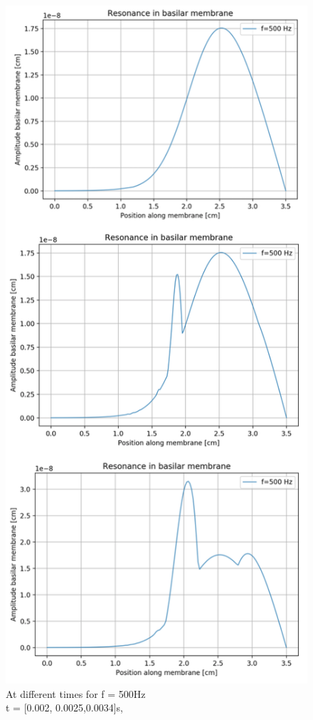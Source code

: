 \documentclass[twoside,twocolumn]{article}
\begin{document}
\begin{figure}[ht]
\centerline{\includegraphics[scale= 0.65]{Pictures/together.png}}
\caption{At different times for f = 500Hz \\ t = [0.002, 0.0025,0.0034]s, }
\end{figure}
\end{document}
